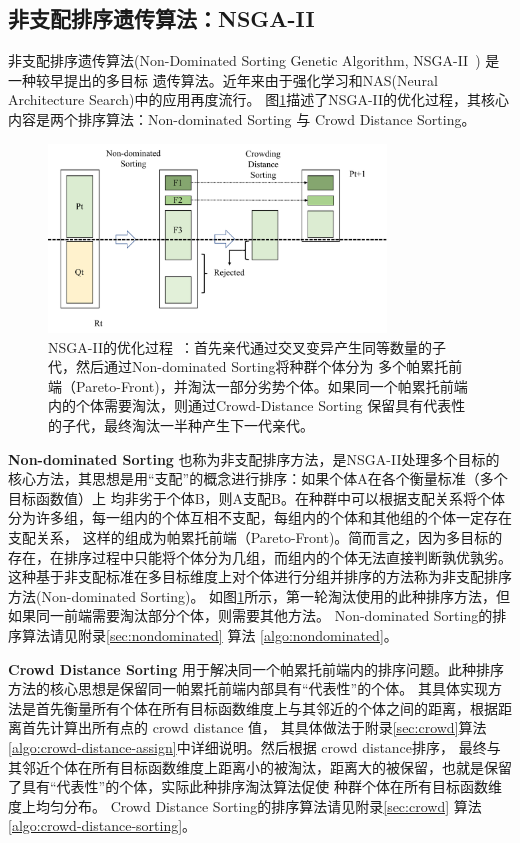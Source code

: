 \subsection{非支配排序遗传算法：NSGA-II}

非支配排序遗传算法(Non-Dominated Sorting Genetic Algorithm, NSGA-II~\cite{deb2002fast}) 是一种较早提出的多目标
遗传算法。近年来由于强化学习\cite{li2019deep}和NAS(Neural Architecture Search)\cite{lu2019nsga}中的应用再度流行。
图\ref{fig:NSGA-II}描述了NSGA-II的优化过程，其核心内容是两个排序算法：Non-dominated Sorting 与 Crowd Distance Sorting。

\begin{figure}[h]
	\centering
	\includegraphics[width=0.8\textwidth]{figure/NSGA-II}
	\caption{NSGA-II的优化过程~\cite{deb2002fast}：首先亲代通过交叉变异产生同等数量的子代，然后通过Non-dominated Sorting将种群个体分为
	多个帕累托前端（Pareto-Front)，并淘汰一部分劣势个体。如果同一个帕累托前端内的个体需要淘汰，则通过Crowd-Distance Sorting
	保留具有代表性的子代，最终淘汰一半种产生下一代亲代。} 
	\label{fig:NSGA-II}
\end{figure}

{\bf Non-dominated Sorting}
也称为非支配排序方法，是NSGA-II处理多个目标的核心方法，其思想是用“支配”的概念进行排序：如果个体A在各个衡量标准（多个目标函数值）上
均非劣于个体B，则A支配B。在种群中可以根据支配关系将个体分为许多组，每一组内的个体互相不支配，每组内的个体和其他组的个体一定存在支配关系，
这样的组成为帕累托前端（Pareto-Front)。简而言之，因为多目标的存在，在排序过程中只能将个体分为几组，而组内的个体无法直接判断孰优孰劣。
这种基于非支配标准在多目标维度上对个体进行分组并排序的方法称为非支配排序方法(Non-dominated Sorting)。
如图\ref{fig:NSGA-II}所示，第一轮淘汰使用的此种排序方法，但如果同一前端需要淘汰部分个体，则需要其他方法。
Non-dominated Sorting的排序算法请见附录\ref{sec:nondominated} 算法 \ref{algo:nondominated}。


{\bf Crowd Distance Sorting}
用于解决同一个帕累托前端内的排序问题。此种排序方法的核心思想是保留同一帕累托前端内部具有“代表性”的个体。
其具体实现方法是首先衡量所有个体在所有目标函数维度上与其邻近的个体之间的距离，根据距离首先计算出所有点的 crowd distance 值，
其具体做法于附录\ref{sec:crowd}算法 \ref{algo:crowd-distance-assign}中详细说明。然后根据 crowd distance排序，
最终与其邻近个体在所有目标函数维度上距离小的被淘汰，距离大的被保留，也就是保留了具有“代表性”的个体，实际此种排序淘汰算法促使
种群个体在所有目标函数维度上均匀分布。
Crowd Distance Sorting的排序算法请见附录\ref{sec:crowd} 算法 \ref{algo:crowd-distance-sorting}。



